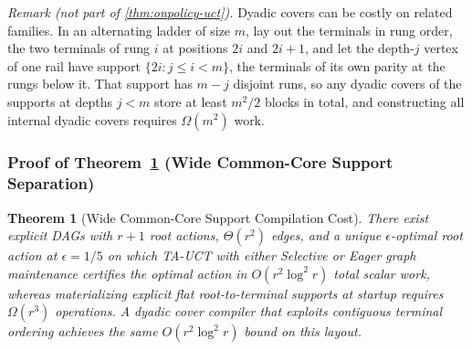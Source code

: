 \documentclass{article}
\theoremstyle{plain}
\newtheorem{theorem}{Theorem}[section]
\theoremstyle{definition}
\begin{document}
\noindent\emph{Remark (not part of \cref{thm:onpolicy-uct}).} Dyadic
covers can be costly on related families. In an alternating ladder of
size $m$, lay out the terminals in rung order, the two terminals of
rung $i$ at positions $2i$ and $2i+1$, and let the depth-$j$ vertex of
one rail have support $\{2i:j\le i<m\}$, the terminals of its own
parity at the rungs below it. That support has $m-j$ disjoint runs, so
any dyadic covers of the supports at depths $j<m$ store at least
$m^2/2$ blocks in total, and constructing all internal dyadic covers
requires $\Omega(m^2)$ work.

\subsubsection{Proof of Theorem~\ref{thm:ta-core} (Wide Common-Core Support Separation)}

\begin{theorem}[Wide Common-Core Support Compilation Cost]
\label{thm:ta-core}
\label{thm:core-uct}
There exist explicit DAGs with $r+1$ root actions, $\Theta(r^2)$ edges, and a unique $\epsilon$-optimal root action at $\epsilon = 1/5$ on which TA-UCT with either \emph{Selective} or \emph{Eager} graph maintenance certifies the optimal action in $O(r^2 \log^2 r)$ total scalar work, whereas materializing explicit flat root-to-terminal supports at startup requires $\Omega(r^3)$ operations. A dyadic cover compiler that exploits contiguous terminal ordering achieves the same $O(r^2 \log^2 r)$ bound on this layout.
\end{theorem}
\end{document}
